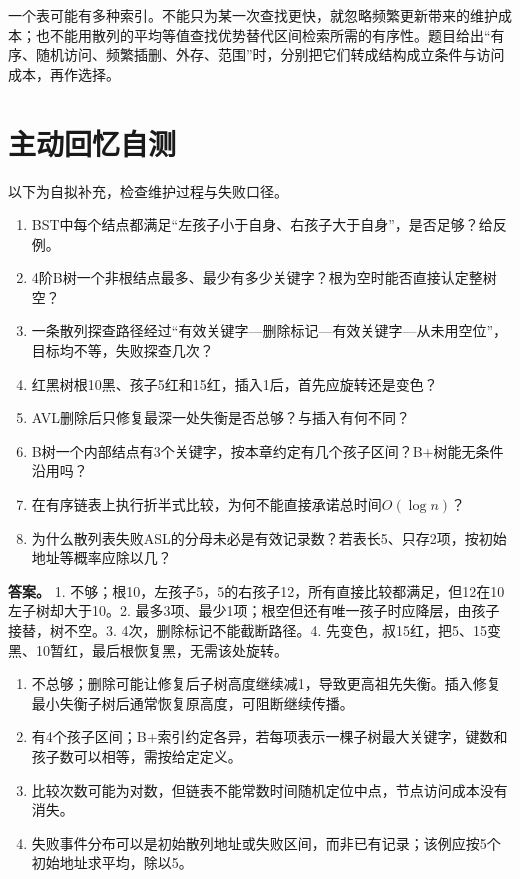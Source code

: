 一个表可能有多种索引。不能只为某一次查找更快，就忽略频繁更新带来的维护成本；也不能用散列的平均等值查找优势替代区间检索所需的有序性。题目给出``有序、随机访问、频繁插删、外存、范围''时，分别把它们转成结构成立条件与访问成本，再作选择。

\section{主动回忆自测}\label{DS07-check}

以下为自拟补充，检查维护过程与失败口径。

\begin{enumerate}
\def\labelenumi{\arabic{enumi}.}
\item
  BST中每个结点都满足``左孩子小于自身、右孩子大于自身''，是否足够？给反例。
\item
  4阶B树一个非根结点最多、最少有多少关键字？根为空时能否直接认定整树空？
\item
  一条散列探查路径经过``有效关键字---删除标记---有效关键字---从未用空位''，目标均不等，失败探查几次？
\item
  红黑树根10黑、孩子5红和15红，插入1后，首先应旋转还是变色？
\item
  AVL删除后只修复最深一处失衡是否总够？与插入有何不同？
\item
  B树一个内部结点有3个关键字，按本章约定有几个孩子区间？B+树能无条件沿用吗？
\item
  在有序链表上执行折半式比较，为何不能直接承诺总时间\(O(\log n)\)？
\item
  为什么散列表失败ASL的分母未必是有效记录数？若表长5、只存2项，按初始地址等概率应除以几？
\end{enumerate}

\textbf{答案。} 1. 不够；根10，左孩子5，5的右孩子12，所有直接比较都满足，但12在10左子树却大于10。2. 最多3项、最少1项；根空但还有唯一孩子时应降层，由孩子接替，树不空。3. 4次，删除标记不能截断路径。4. 先变色，叔15红，把5、15变黑、10暂红，最后根恢复黑，无需该处旋转。

\begin{enumerate}
\def\labelenumi{\arabic{enumi}.}
\setcounter{enumi}{4}
\tightlist
\item
  不总够；删除可能让修复后子树高度继续减1，导致更高祖先失衡。插入修复最小失衡子树后通常恢复原高度，可阻断继续传播。
\item
  有4个孩子区间；B+索引约定各异，若每项表示一棵子树最大关键字，键数和孩子数可以相等，需按给定定义。
\item
  比较次数可能为对数，但链表不能常数时间随机定位中点，节点访问成本没有消失。
\item
  失败事件分布可以是初始散列地址或失败区间，而非已有记录；该例应按5个初始地址求平均，除以5。
\end{enumerate}

